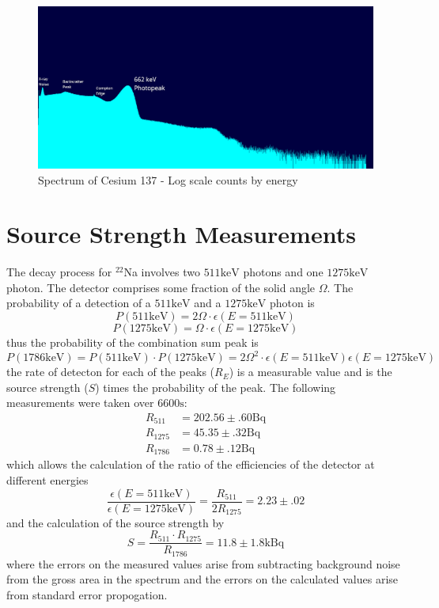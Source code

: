 \documentclass[12pt, a4paper]{article}
\begin{document}
	\begin{figure}[H] \centering
		\includegraphics[scale=0.3]{assets/cs137_log_annotated.png}
		\caption{Spectrum of Cesium 137 - Log scale counts by energy}
	\end{figure}

\section{Source Strength Measurements}
	The decay process for $^{22}$Na involves two $511\unit{\keV}$ photons and one $1275\unit{\keV}$ photon. The detector comprises some fraction of the solid angle $\Omega$. The probability of a detection of a $511\unit{\keV}$ and a $1275\unit{\keV}$ photon is
	\begin{equation}
		P(511\unit{\keV}) = 2\Omega\cdot\epsilon(E=511\unit{\keV})
	\end{equation}
	\begin{equation}
		P(1275\unit{\keV}) = \Omega\cdot\epsilon(E=1275\unit{\keV})
	\end{equation}
	thus the probability of the combination sum peak is
	\begin{equation}
		P(1786\unit{\keV}) = P(511\unit{\keV})\cdot P(1275\unit{\keV}) = 2\Omega^2\cdot\epsilon(E=511\unit{\keV})\epsilon(E=1275\unit{\keV})
	\end{equation}
	the rate of detecton for each of the peaks ($R_E$) is a measurable value and is the source strength ($S$) times the probability of the peak. The following measurements were taken over $6600\unit{\s}$:
	\begin{align}
		R_{511} &= 202.56\pm.60\unit{\becquerel}\\
		R_{1275} &= 45.35\pm.32\unit{\becquerel}\\
		R_{1786} &= 0.78\pm.12\unit{\becquerel}
	\end{align}
	which allows the calculation of the ratio of the efficiencies of the detector at different energies
	\begin{equation}
		\frac{\epsilon(E=511\unit{\keV})}{\epsilon(E=1275\unit{\keV})} = \frac{R_{511}}{2R_{1275}} = 2.23\pm.02
	\end{equation}
	and the calculation of the source strength by
	\begin{equation}
		S = \frac{R_{511}\cdot R_{1275}}{R_{1786}} = 11.8\pm1.8\unit{\kilo\becquerel}
	\end{equation}
	where the errors on the measured values arise from subtracting background noise from the gross area in the spectrum and the errors on the calculated values arise from standard error propogation.
\end{document}
